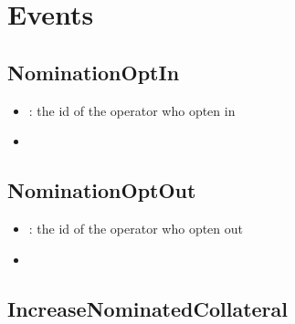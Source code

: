 \documentclass[a4paper,10pt,english]{sphinxmanual}
\begin{document}
\section{Events}
\label{\detokenize{spec/nomination:events}}

\subsection{NominationOptIn}
\label{\detokenize{spec/nomination:nominationoptin}}


\begin{itemize}
\item {} 
: the id of the operator who opten in

\end{itemize}

\begin{itemize}
\item {} 
{\hyperref[\detokenize{spec/nomination:optintonomination}]{}}

\end{itemize}


\subsection{NominationOptOut}
\label{\detokenize{spec/nomination:nominationoptout}}


\begin{itemize}
\item {} 
: the id of the operator who opten out

\end{itemize}

\begin{itemize}
\item {} 
{\hyperref[\detokenize{spec/nomination:optoutofnomination}]{}}

\end{itemize}


\subsection{IncreaseNominatedCollateral}
\label{\detokenize{spec/nomination:increasenominatedcollateral}}
\end{document}
